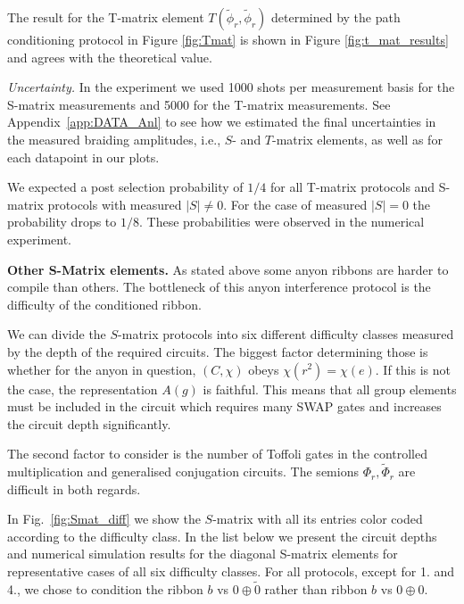 \documentclass[a4paper,twocolumn,11pt]{quantumarticle}
\begin{document}
The result for the T-matrix element $T(\tilde \phi_r, \tilde \phi_r)$ determined by the path conditioning protocol in Figure \ref{fig:Tmat} is shown in Figure \ref{fig:t_mat_results} and agrees with the theoretical value.



\emph{Uncertainty.} In the experiment we used 1000 shots per measurement basis for the S-matrix measurements and 5000 for the T-matrix measurements. See Appendix~\ref{app:DATA_Anl} to see how we estimated the final uncertainties in the measured braiding amplitudes, i.e., $S$- and $T$-matrix elements, as well as for each datapoint in our plots.

We expected a post selection probability of $1/4$ for all T-matrix protocols and S-matrix protocols with measured $|S| \neq 0$. For the case of measured $|S| = 0$ the probability drops to $1/8$. These probabilities were observed in the numerical experiment.

\textbf{Other S-Matrix elements.}
As stated above some anyon ribbons are harder to compile than others. The bottleneck of this anyon interference protocol is the difficulty of the conditioned ribbon. 

We can divide the $S$-matrix protocols into six different difficulty classes measured by the depth of the required circuits. The biggest factor determining those is whether for the anyon in question, $(C, \chi)$ obeys $\chi(r^2) = \chi(e)$. If this is not the case, the representation $A{(g)}$ is faithful. This means that all group elements must be included in the circuit which requires many SWAP gates and increases the circuit depth significantly.

The second factor to consider is the number of Toffoli gates in the controlled multiplication and generalised conjugation circuits. The semions $\Phi_r,\tilde \Phi_r$ are difficult in both regards. 

In Fig.~\ref{fig:Smat_diff} we show the $S$-matrix with all its entries color coded according to the difficulty class. In the list below we present the circuit depths and numerical simulation results for the diagonal S-matrix elements for representative cases of all six difficulty classes. For all protocols, except for 1. and 4., we chose to condition the ribbon $b$ vs $0\oplus \tilde 0$ rather than ribbon $b$ vs $0 \oplus 0$.
\end{document}
